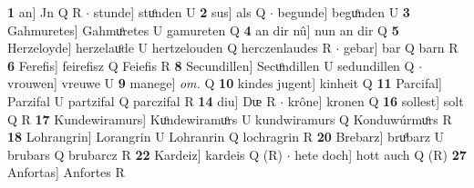 \documentclass[8pt,a4paper,notitlepage]{article}
\begin{document}
\begin{table}[ht]
\begin{minipage}[t]{0.5\linewidth}
\textbf{1} an] Jn Q R  $\cdot$ stunde] stuͦnden U \textbf{2} sus] als Q  $\cdot$ begunde] beguͦnden U \textbf{3} Gahmuretes] Gahmuͦretes U gamureten Q \textbf{4} an dir nû] nun an dir Q \textbf{5} Herzeloyde] herzelauͦde U hertzelouden Q herczenlaudes R  $\cdot$ gebar] bar Q barn R \textbf{6} Ferefis] feirefisz Q Feiefis R \textbf{8} Secundillen] Secuͦndillen U sedundillen Q  $\cdot$ vrouwen] vreuwe U \textbf{9} manege] \textit{om.} Q \textbf{10} kindes jugent] kinheit Q \textbf{11} Parcifal] Parzifal U partzifal Q parczifal R \textbf{14} diu] Dᵫ R  $\cdot$ krône] kronen Q \textbf{16} sollest] solt Q R \textbf{17} Kundewiramurs] Kuͦndewiramuͦrs U kundwiramurs Q Konduwúrmuͦrs R \textbf{18} Lohrangrin] Lorangrin U Lohranrin Q lochragrin R \textbf{20} Brebarz] bruͦbarz U brubars Q brubarcz R \textbf{22} Kardeiz] kardeis Q (R)  $\cdot$ hete doch] hott auch Q (R) \textbf{27} Anfortas] Anfortes R \newline
\end{minipage}
\end{table}
\end{document}
